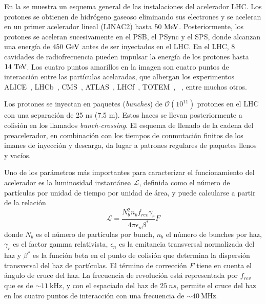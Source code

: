 En la \Fig{\ref{fig:atlas:lhc:lhc}} se muestra un esquema general de las instalaciones del acelerador \ac{LHC}. Los protones se obtienen de hidrógeno gaseoso eliminando sus electrones y se aceleran en un primer acelerador lineal (LINAC2) hasta \(50~\text{MeV}\). Posteriormente, los protones se aceleran sucesivamente en el \ac{PSB}, el \ac{PSync} y el \ac{SPS}, donde alcanzan una energía de \(450~\text{GeV}\) antes de ser inyectados en el \ac{LHC}. En el \ac{LHC}, 8 cavidades de radiofrecuencia pueden impulsar la energía de los protones hasta \(14~\text{TeV}\). Los cuatro puntos amarillos en la imagen \Fig{\ref{fig:atlas:lhc:lhc}} son cuatro puntos de interacción entre las partículas acelaradas, que albergan los experimentos \acs{ALICE}~\cite{ALICE}, \acs{LHCb}~\cite{LHCb}, \acs{CMS}~\cite{CMS}, \acs{ATLAS}~\cite{ATLAS}, \acs{LHCf}~\cite{LHCf}, \acs{TOTEM}~\cite{TOTEM}, ~\cite{MoEDAL}, entre muchos otros.

Los protones se inyectan en paquetes (\textit{bunches}) de \(\mathcal{O}(10^{11})\) protones en el \ac{LHC} con una separación de 25 ns (7.5 m). Estos haces se llevan posteriormente a colisión en los llamados \textit{bunch-crossing}. El esquema de llenado de la cadena del preacelerador, en combinación con los tiempos de conmutación finitos de los imanes de inyección y descarga, da lugar a patrones regulares de paquetes llenos y vacíos.




Uno de los parámetros más importantes para caracterizar el funcionamiento del acelerador es la luminosidad instantánea \(\mathcal{L}\), definida como el número de partículas por unidad de tiempo por unidad de área, y puede calcularse a partir de la relación
\begin{equation}
    \mathcal{L} = \frac{N_b^ 2n_b f_{rev}\gamma_r}{4\pi\epsilon_n\beta^*}F
    \label{eq:atlas:LHC:instantaneous_lumi}
\end{equation}
donde $N_b$ es el número de partículas por bunch, $n_b$ el número de bunches por haz, $\gamma_r$ es el factor gamma relativista, $\epsilon_n$ es la emitancia transversal normalizada del haz y $\beta^*$ es la función beta en el punto de colisión que determina la dispersión transversal del haz de partículas. El término de corrección $F$ tiene en cuenta el ángulo de cruce del haz. La frecuencia de revolución está representada por $f_{rev}$ que es de \(\sim 11~\)kHz, y con el espaciado del haz de \(25~ns\), permite el cruce del haz en los cuatro puntos de interacción con una frecuencia de \(\sim 40~\)MHz.

